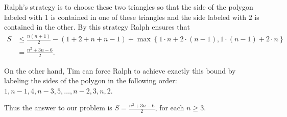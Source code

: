 \documentclass[a4paper,12pt]{article}
\begin{document}
\begin{enumerate}
	Ralph’s strategy is to choose these two triangles so that the side of the polygon labeled with $1$ is contained in one of these triangles and the side labeled with $2$ is contained in the other. By this strategy Ralph ensures that \begin{align*} S &\leq \frac{n(n+1)}{2} -(1+2+n+n-1) +\max\left\{1\cdot n +2\cdot (n-1), 1\cdot (n-1) +2\cdot n\right\} \\ &= \frac{n^2+3n-6}{2}.\end{align*}
	
	On the other hand, Tim can force Ralph to achieve exactly this bound by labeling the sides of the polygon in the following order: $1, n-1, 4, n-3, 5, \dots, n-2, 3, n, 2$.
	
	Thus the answer to our problem is $S = \frac{n^2+3n-6}{2}$, for each $n\geq 3$.

\end{enumerate}
\end{document}
